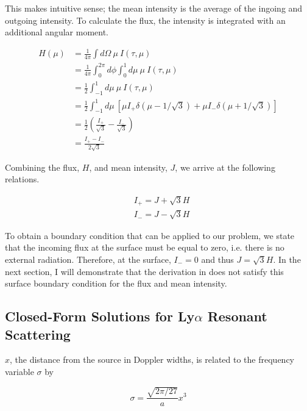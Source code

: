 \documentclass[onecolumn]{aastex63}
\begin{document}
This makes intuitive sense; the mean intensity is the average of the ingoing and outgoing intensity. To calculate the flux, the intensity is integrated with an additional angular moment.


\begin{equation}
    \begin{split}
        H(\mu) &= \frac{1}{4\pi}\int d\Omega\ \mu\ I(\tau, \mu)\\
        &= \frac{1}{4\pi}\int_0^{2\pi} d\phi \int_0^1 d\mu\ \mu\ I(\tau, \mu)\\
        &= \frac{1}{2} \int_{-1}^1 d\mu\ \mu\ I(\tau, \mu)\\
        &= \frac{1}{2} \int_{-1}^1 d\mu\ \left[\mu I_+ \delta(\mu - 1/\sqrt{3}) + \mu I_- \delta(\mu + 1/\sqrt{3})\right]\\
        &= \frac{1}{2} \left( \frac{I_+}{\sqrt{3}} - \frac{I_-}{\sqrt{3}}\right) \\
        &= \frac{I_+ - I_-}{2\sqrt{3}}
    \end{split}
\end{equation}

Combining the flux, $H$, and mean intensity, $J$, we arrive at the following relations.

\begin{equation}
    \begin{split}
        &I_+ = J + \sqrt{3}H \\
        &I_- = J - \sqrt{3}H
    \end{split}
\end{equation}

To obtain a boundary condition that can be applied to our problem, we state that the incoming flux at the surface must be equal to zero, i.e. there is no external radiation. Therefore, at the surface, $I_- = 0$ and thus $J=\sqrt{3}H$. In the next section, I will demonstrate that the derivation in \cite{2006ApJ...649...14D} does not satisfy this surface boundary condition for the flux and mean intensity.

\subsection{Closed-Form Solutions for Ly$\alpha$ Resonant Scattering}

$x$, the distance from the source in Doppler widths, is related to the frequency variable $\sigma$ by 

\begin{equation} \label{sigma}
    \sigma = \frac{\sqrt{2\pi/27}}{a} x^3
\end{equation}
\end{document}
